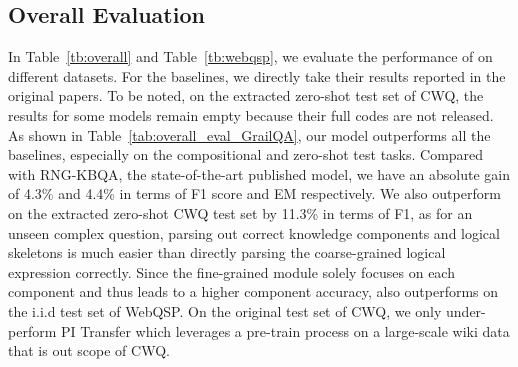 \subsection{Overall Evaluation}
In Table~\ref{tb:overall} and Table~\ref{tb:webqsp}, we evaluate the performance of \smodel on different datasets. 
For the baselines, we directly take their results reported in the original papers. To be noted, on the extracted zero-shot test set of CWQ, the results for some models remain empty because their full codes are not released.
As shown in Table~\ref{tab:overall_eval_GrailQA}, our model outperforms all the baselines, especially on the compositional and zero-shot test tasks. Compared with RNG-KBQA, the state-of-the-art published model, we have an absolute gain of 4.3\% and 4.4\% in terms of F1 score and EM respectively. We also outperform on the extracted zero-shot CWQ test set by 11.3\% in terms of F1, as for an unseen complex question, parsing out correct knowledge components and logical skeletons is much easier than directly parsing the coarse-grained logical expression correctly.
Since the fine-grained module solely focuses on each component and thus leads to a higher component accuracy, \smodel also outperforms on the i.i.d test set of WebQSP. On the original test set of CWQ, we only under-perform PI Transfer which leverages a pre-train process on a large-scale wiki data that is out scope of CWQ. 




